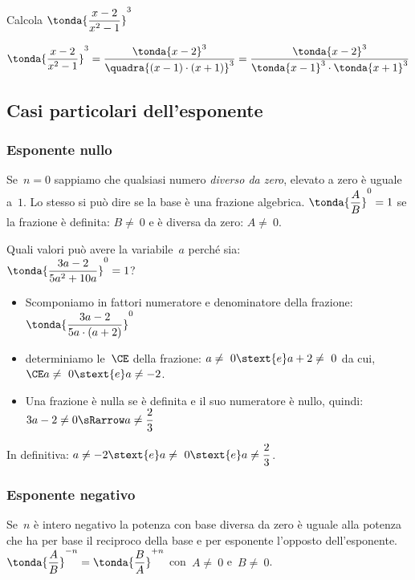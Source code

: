 \begin{esempio}{}{}
Calcola  \( \tonda{\dfrac{x-2}{x^{2}-1}} ^{3}\)

\vspace{-.5em}
\[\tonda{\dfrac{x-2}{x^{2}-1}} ^{3} =
\dfrac{\tonda{x-2}^3}{\quadra{(x-1)\cdot(x+1)}^3} = 
\dfrac{\tonda{x-2}^3}{\tonda{x-1}^3 \cdot \tonda{x+1}^3}\]
\end{esempio}

\subsection{Casi particolari dell'esponente}

\subsubsection{Esponente nullo}
Se~\(n = 0\) sappiamo che qualsiasi numero \emph{diverso da zero}, elevato a 
zero è uguale a~\(1\). 
Lo stesso si può dire se la base è una frazione algebrica.
\(\tonda{\dfrac{A}{B}}^0=1\) se la frazione è definita: 
\(B\neq~0\) e è diversa da zero: \(A\neq~0\).

\begin{esempio}{}{}
Quali valori può avere la variabile~\(a\) perché sia: \\
\(\tonda{\dfrac{3a-2}{5a^{2}+10a}} ^{0}=1\)?

\vspace{.5em}
\begin{itemize}[nosep]
\item Scomponiamo in fattori numeratore e denominatore della 
frazione:\\ \( \tonda{\dfrac{3a-2}{5a\cdot (a+2)}} ^{0}\)
\item determiniamo le~\(\CE\) della frazione:
\(a\neq~0 \stext{e} a+2\neq~0\) 
da cui, \(\CE a\neq~0 \stext{e} a\neq -2\).
\item Una frazione è nulla se è definita e il suo numeratore è nullo, 
quindi:
\(3a-2 \neq 0 \sRarrow a\neq \dfrac{2}{3}\)
\end{itemize}
In definitiva: \(a\neq -2 \stext{e} a\neq~0 \stext{e} a\neq \dfrac{2}{3}\).
\end{esempio}

\subsubsection{Esponente negativo}
Se~\(n\) è intero negativo la potenza con base diversa da zero è uguale alla 
potenza che ha per base il reciproco della base e per esponente l'opposto
dell'esponente. 
\( \tonda{\dfrac{A}{B}} ^{-n}=
\tonda{\dfrac{B}{A}} ^{+n}\) con~\(A\neq~0\) e~\(B\neq~0\).

